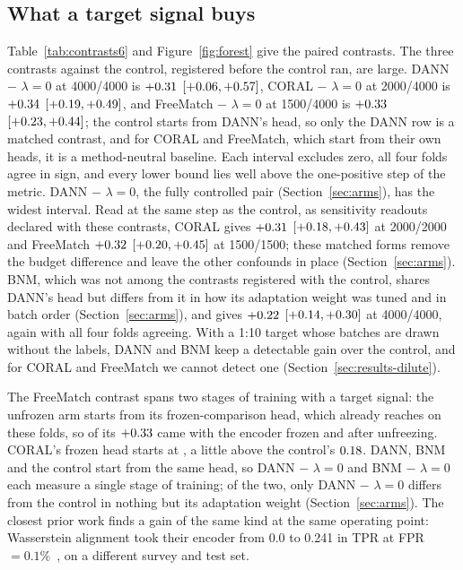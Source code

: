 

\subsection{What a target signal buys}
\label{sec:results-ablation}

Table~\ref{tab:contrasts6} and Figure~\ref{fig:forest} give the paired contrasts. The three
contrasts against the control, registered before the control ran, are large. DANN $-$ $\lambda=0$ at 4000/4000 is
$+0.31{}$ $[+0.06{}, +0.57{}]$, CORAL $-$ $\lambda=0$ at 2000/4000 is
$+0.34{}$ $[+0.19{}, +0.49{}]$, and FreeMatch $-$ $\lambda=0$ at
1500/4000 is $+0.33{}$ $[+0.23{}, +0.44{}]$; the control starts from
DANN's head, so only the DANN row is a matched contrast, and for CORAL and FreeMatch, which start
from their own heads, it is a method-neutral baseline. Each interval excludes zero,
all four folds agree in sign, and every lower bound lies well above the one-positive step of
the metric. DANN $-$ $\lambda=0$, the fully controlled pair (Section~\ref{sec:arms}), has the
widest interval. Read at the same step as the control, as sensitivity readouts declared with these contrasts,
CORAL gives $+0.31{}$ $[+0.18{}, +0.43{}]$ at 2000/2000 and FreeMatch
$+0.32{}$ $[+0.20{}, +0.45{}]$ at 1500/1500; these matched forms remove the
budget difference and leave the other confounds in place (Section~\ref{sec:arms}). BNM,
which was not among the contrasts registered with the control, shares DANN's head but differs
from it in how its adaptation weight was tuned and in batch order (Section~\ref{sec:arms}), and
gives
$+0.22{}$ $[+0.14{}, +0.30{}]$ at 4000/4000, again with all four folds
agreeing. With a 1:10 target whose batches are drawn
without the labels, DANN and BNM keep a detectable gain over the control, and for CORAL and
FreeMatch we cannot detect one (Section~\ref{sec:results-dilute}).

The
FreeMatch contrast spans two stages of training with a target signal: the unfrozen arm starts
from its frozen-comparison head, which already reaches \rwFiveFmStart{} on these folds, so
\rwFiveFmFrozenPart{} of its $+0.33{}$ came with the encoder frozen and
\rwFiveFmUnfrozenPart{} after unfreezing. CORAL's frozen head starts at \rwFiveCoralStart{},
a little above the control's $0.18{}$. DANN, BNM and the control start from the same head, so
DANN $-$ $\lambda = 0$ and BNM $-$ $\lambda = 0$ each measure a single stage of training; of
the two, only DANN $-$ $\lambda = 0$ differs from the control in nothing but its adaptation
weight (Section~\ref{sec:arms}). The closest prior work finds a gain of the same
kind at the same operating point: Wasserstein alignment took their encoder from 0.0 to 0.241
in TPR at FPR${}=0.1\%$~\citep{parul2024}, on a different survey and test set.

